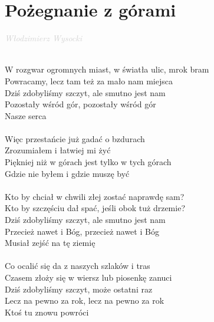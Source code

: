 \documentclass[a5paper, 10pt]{book}
\begin{document}
\section{Pożegnanie z górami}\textcolor{lightgray}{\textit{Włodzimierz Wysocki}}\\~\\
\begin{minipage}[t]{0.8\textwidth}
W rozgwar ogromnych miast, w światła ulic, mrok bram\\
Powracamy, lecz tam też za mało nam miejsca\\
Dziś zdobyliśmy szczyt, ale smutno jest nam\\
Pozostały wśród gór, pozostały wśród gór\\
Nasze serca\\
\\
\hspace*{3mm}Więc przestańcie już gadać o bzdurach\\
\hspace*{3mm}Zrozumiałem i łatwiej mi żyć\\
\hspace*{3mm}Piękniej niż w górach jest tylko w tych górach\\
\hspace*{3mm}Gdzie nie byłem i gdzie muszę być\\
\\
Kto by chciał w chwili złej zostać naprawdę sam?\\
Kto by szczęściu dał spać, jeśli obok tuż drzemie?\\
Dziś zdobyliśmy szczyt, ale smutno jest nam\\
Przecież nawet i Bóg, przecież nawet i Bóg\\
Musiał zejść na tę ziemię\\
\\
Co ocalić się da z naszych szlaków i tras\\
Czasem złoży się w wiersz lub piosenkę zanuci\\
Dziś zdobyliśmy szczyt, może ostatni raz\\
Lecz na pewno za rok, lecz na pewno za rok\\
Ktoś tu znowu powróci\\
\\

\end{minipage}
\end{document}
